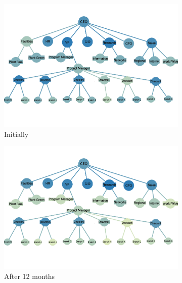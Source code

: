 \documentclass[tcn = 37075, sheet = false, abstract = false]{mcmthesis}
\begin{document}
\begin{figure}[t!]
        \centering
        \begin{subfigure}[h]{0.45\textwidth}
                \includegraphics[width=\textwidth]{figures/0.pdf}
                \caption{Initially}
        \end{subfigure}%
        \begin{subfigure}[h]{0.45\textwidth}
                \includegraphics[width=\textwidth]{figures/12.pdf}
                \caption{After 12 months}
        \end{subfigure}
        \begin{subfigure}[h]{0.45\textwidth}

\end{subfigure}
\end{figure}
\end{document}
